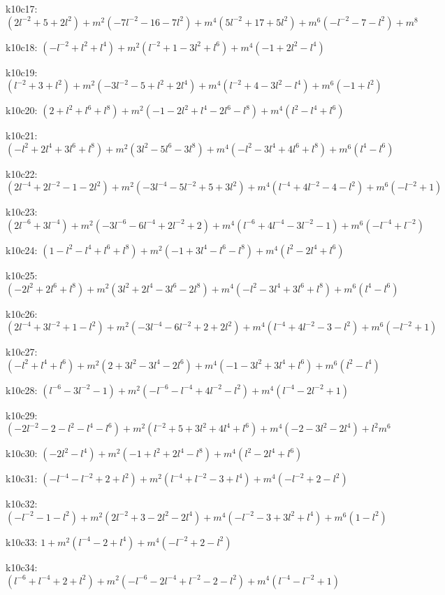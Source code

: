 k10c17: $ (2l^{-2}+5+2l^{2})  +m^{2}(-7l^{-2}-16-7l^{2})  +m^{4}(5l^{-2}+17+5l^{2})  +m^{6}(-l^{-2}-7-l^{2})  +m^{8} $ 

k10c18: $ (-l^{-2}+l^{2}+l^{4})  +m^{2}(l^{-2}+1-3l^{2}+l^{6})  +m^{4}(-1+2l^{2}-l^{4}) $ 

k10c19: $ (l^{-2}+3+l^{2})  +m^{2}(-3l^{-2}-5+l^{2}+2l^{4})  +m^{4}(l^{-2}+4-3l^{2}-l^{4})  +m^{6}(-1+l^{2}) $ 

k10c20: $ (2+l^{2}+l^{6}+l^{8})  +m^{2}(-1-2l^{2}+l^{4}-2l^{6}-l^{8})  +m^{4}(l^{2}-l^{4}+l^{6}) $ 

k10c21: $ (-l^{2}+2l^{4}+3l^{6}+l^{8})  +m^{2}(3l^{2}-5l^{6}-3l^{8})  +m^{4}(-l^{2}-3l^{4}+4l^{6}+l^{8})  +m^{6}(l^{4}-l^{6}) $ 

k10c22: $ (2l^{-4}+2l^{-2}-1-2l^{2})  +m^{2}(-3l^{-4}-5l^{-2}+5+3l^{2})  +m^{4}(l^{-4}+4l^{-2}-4-l^{2})  +m^{6}(-l^{-2}+1) $ 

k10c23: $ (2l^{-6}+3l^{-4})  +m^{2}(-3l^{-6}-6l^{-4}+2l^{-2}+2)  +m^{4}(l^{-6}+4l^{-4}-3l^{-2}-1)  +m^{6}(-l^{-4}+l^{-2}) $ 

k10c24: $ (1-l^{2}-l^{4}+l^{6}+l^{8})  +m^{2}(-1+3l^{4}-l^{6}-l^{8})  +m^{4}(l^{2}-2l^{4}+l^{6}) $ 

k10c25: $ (-2l^{2}+2l^{6}+l^{8})  +m^{2}(3l^{2}+2l^{4}-3l^{6}-2l^{8})  +m^{4}(-l^{2}-3l^{4}+3l^{6}+l^{8})  +m^{6}(l^{4}-l^{6}) $ 

k10c26: $ (2l^{-4}+3l^{-2}+1-l^{2})  +m^{2}(-3l^{-4}-6l^{-2}+2+2l^{2})  +m^{4}(l^{-4}+4l^{-2}-3-l^{2})  +m^{6}(-l^{-2}+1) $ 

k10c27: $ (-l^{2}+l^{4}+l^{6})  +m^{2}(2+3l^{2}-3l^{4}-2l^{6})  +m^{4}(-1-3l^{2}+3l^{4}+l^{6})  +m^{6}(l^{2}-l^{4}) $ 

k10c28: $ (l^{-6}-3l^{-2}-1)  +m^{2}(-l^{-6}-l^{-4}+4l^{-2}-l^{2})  +m^{4}(l^{-4}-2l^{-2}+1) $ 

k10c29: $ (-2l^{-2}-2-l^{2}-l^{4}-l^{6})  +m^{2}(l^{-2}+5+3l^{2}+4l^{4}+l^{6})  +m^{4}(-2-3l^{2}-2l^{4})  +l^{2}m^{6} $ 

k10c30: $ (-2l^{2}-l^{4})  +m^{2}(-1+l^{2}+2l^{4}-l^{8})  +m^{4}(l^{2}-2l^{4}+l^{6}) $ 

k10c31: $ (-l^{-4}-l^{-2}+2+l^{2})  +m^{2}(l^{-4}+l^{-2}-3+l^{4})  +m^{4}(-l^{-2}+2-l^{2}) $ 

k10c32: $ (-l^{-2}-1-l^{2})  +m^{2}(2l^{-2}+3-2l^{2}-2l^{4})  +m^{4}(-l^{-2}-3+3l^{2}+l^{4})  +m^{6}(1-l^{2}) $ 

k10c33: $ 1  +m^{2}(l^{-4}-2+l^{4})  +m^{4}(-l^{-2}+2-l^{2}) $ 

k10c34: $ (l^{-6}+l^{-4}+2+l^{2})  +m^{2}(-l^{-6}-2l^{-4}+l^{-2}-2-l^{2})  +m^{4}(l^{-4}-l^{-2}+1) $ 

